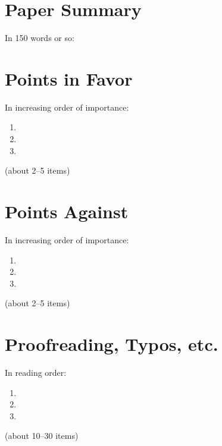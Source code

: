 \documentclass{article}                 %
\begin{document}
\maketitle

\begin{flushright}
  \begin{minipage}{2.5in}
    \normalsize \rmfamily\scshape\bfseries
    \color{red}{%
      Thou Mortal, Be Warned. \newline
      Thou Shallt Not Remove \newline
      This Commandment \newline
      While There Are Signs of Haste \newline
      in This Document!!!!\newline
    }
  \end{minipage}
\end{flushright}

\section{Paper Summary}
In 150 words or so: 
\lipsum

\section{Points in Favor}
In increasing order of importance:
\begin{enumerate}
    \item \lipsum
    \item \lipsum
    \item \lipsum
\end{enumerate}
(about 2--5 items)


\section{Points Against }
In increasing order of importance:
\begin{enumerate}
    \item \lipsum
    \item \lipsum
    \item \lipsum
\end{enumerate}
(about 2--5 items)

\section{Proofreading, Typos, etc.}
In reading order: 
\begin{enumerate}
    \item \lipsum
    \item \lipsum
    \item \lipsum
\end{enumerate}
(about 10--30 items)
\end{document}
